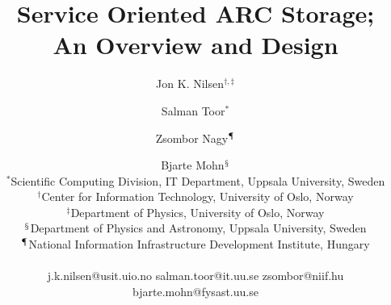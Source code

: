 \documentclass[final]{ieee}
\begin{document}
\pagestyle{headings} 
\title{Service Oriented ARC Storage; \\An Overview and Design}
\author{  Jon K. Nilsen$^{\dagger,\ddagger}$ \and Salman Toor$^{*}$
  \and Zsombor Nagy$^{\mathparagraph}$ \and Bjarte Mohn$^{\mathsection}$  \\ $^{*}$Scientific
  Computing Division, IT Department, Uppsala University, Sweden
  \\ $^{\dagger}$Center for Information Technology, University of Oslo, Norway
  \\ $^{\ddagger}$Department of Physics,  University of Oslo, Norway
  \\  $^{\mathsection}$Department of Physics and Astronomy, Uppsala University,
  Sweden \\ $^{\mathparagraph}$National Information Infrastructure Development
  Institute, Hungary\\ \\  j.k.nilsen@usit.uio.no \hspace{5 mm}
  salman.toor@it.uu.se \hspace{5 mm} zsombor@niif.hu \\  \hspace{7 mm}
  bjarte.mohn@fysast.uu.se}
  
\end{document}
